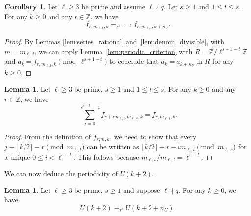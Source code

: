\documentclass[10pt]{article}
\theoremstyle{definition}
\newtheorem{corollary}[theorem]{Corollary}
\newtheorem{lemma}[theorem]{Lemma}
\renewcommand{\:}{\colon}
\begin{document}
\begin{corollary}\label{cor:n_U}
    Let $\ell \geq 3$ be prime and assume $\ell \nmid q$.
     Let $s \geq 1$ and $1 \leq t \leq s$. 
     For any $k \geq 0$ and any $r \in \mathbb Z$, we have
    \[
    f_{r,m_{\ell,t},k} \equiv_{\ell^{s+1-t}} f_{r,m_{\ell,t},k+n_U}.
    \]
\end{corollary}

\begin{proof}
    By Lemmas \ref{lem:series_rational} and~\ref{lem:denom_divisible}, with $m = m_{\ell,t}$, 
    we can 
    apply Lemma~\ref{lem:periodic_criterion} with $R = \mathbb Z/\ell^{s+1-t}\mathbb Z$ and $a_k = f_{r,m_{\ell,t},k} \pmod{\ell^{s+1-t}}$ to conclude that $a_k =a_{k+n_U}$ in $R$ for any $k \geq 0$.
\end{proof}

\begin{lemma}\label{lem:f_sum}
    Let $\ell \geq 3$ be prime, $s \geq 1$ and $1 \leq t \leq s$. For any $k \geq 0$ and any $r \in \mathbb Z$, we have 
    \[
    \sum_{i=0}^{\ell^{s-t}-1} f_{r+im_{\ell,t},m_{\ell,s},k} = f_{r,m_{\ell,t},k}.
    \]
\end{lemma}

\begin{proof}
    From the definition of $f_{r,m,k}$, we need to show that every $j \equiv \lfloor k/2\rfloor - r \pmod{m_{\ell,t}}$ can be written as $\lfloor k/2 \rfloor - r - im_{\ell,t} \pmod{m_{\ell,s}}$ for a unique $0 \leq i < \ell^{s-t}$. This follows because $m_{\ell,s}/m_{\ell,t} = \ell^{s-t}$. 
\end{proof}

We can now deduce the periodicity of $U(k+2)$.

\begin{lemma}\label{lem:U_periodic}
    Let $\ell \geq 3$ be prime, $s \geq 1$ and suppose $\ell \nmid q$. 
    For any $k \geq 0$, we have
    \[
    U(k+2) \equiv_{\ell^s} U(k + 2 + n_U).
    \]
\end{lemma}
\end{document}
